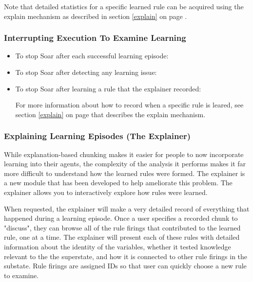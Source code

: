 Note that detailed statistics for a specific learned rule can be acquired using the explain mechanism as described in section \ref{explain} on page \pageref{explain}.

\subsubsection{Interrupting Execution To Examine Learning}

\begin{itemize}
	\item To stop Soar after each successful learning episode: \newline {} 
	\item To stop Soar after detecting any learning issue: \newline {} 
	\item To stop Soar after learning a rule that the explainer recorded: \newline {} 

For more information about how to record when a specific rule is leared, see section \ref{explain} on page \pageref{explain} that describes the explain mechanism.

\end{itemize}
\subsubsection{Explaining Learning Episodes (The Explainer)}

While explanation-based chunking makes it easier for people to now incorporate learning into their agents, the complexity of the analysis it performs makes it far more difficult to understand how the learned rules were formed. The explainer is a new module that has been developed to help ameliorate this problem. The explainer allows you to interactively explore how rules were learned.
 
When requested, the explainer will make a very detailed record of everything that happened during a learning episode. Once a user specifies a recorded chunk to "discuss", they can browse all of the rule firings that contributed to the learned rule, one at a time. The explainer will present each of these rules with detailed information about the identity of the variables, whether it tested knowledge relevant to the the superstate, and how it is connected to other rule firings in the substate. Rule firings are assigned IDs so that user can quickly choose a new rule to examine.

